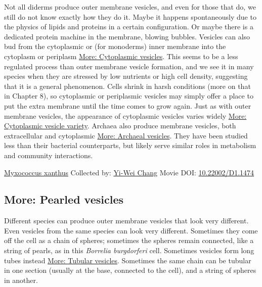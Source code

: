 \documentclass[]{tufte-book}
\begin{document}
Not all diderms produce outer membrane vesicles, and even for those that do, we still do not know exactly how they do it. Maybe it happens spontaneously due to the physics of lipids and proteins in a certain configuration. Or maybe there is a dedicated protein machine in the membrane, blowing bubbles. Vesicles can also bud from the cytoplasmic or (for monoderms) inner membrane into the cytoplasm or periplasm \protect\hyperlink{Cytoplasmic_vesicles}{More: Cytoplasmic vesicles}. This seems to be a less regulated process than outer membrane vesicle formation, and we see it in many species when they are stressed by low nutrients or high cell density, suggesting that it is a general phenomenon. Cells shrink in harsh conditions (more on that in Chapter 8), so cytoplasmic or periplasmic vesicles may simply offer a place to put the extra membrane until the time comes to grow again. Just as with outer membrane vesicles, the appearance of cytoplasmic vesicles varies widely \protect\hyperlink{Cytoplasmic_vesicle_variety}{More: Cytoplasmic vesicle variety}. Archaea also produce membrane vesicles, both extracellular and cytoplasmic \protect\hyperlink{Archaeal_vesicles}{More: Archaeal vesicles}. They have been studied less than their bacterial counterparts, but likely serve similar roles in metabolism and community interactions.



\hypertarget{htmlwidget-994785f686f1c335967d}{}

\label{fig:2-4}\protect\hyperlink{tree}{Myxococcus xanthus} Collected by: \protect\hyperlink{yi-wei_chang}{Yi-Wei Chang} Movie DOI: \href{https://doi.org/10.22002/D1.1474}{10.22002/D1.1474}

\hypertarget{Pearled_vesicles}{%
\subsection*{More: Pearled vesicles}\label{Pearled_vesicles}}

Different species can produce outer membrane vesicles that look very different. Even vesicles from the same species can look very different. Sometimes they come off the cell as a chain of spheres; sometimes the spheres remain connected, like a string of pearls, as in this \emph{Borrelia burgdorferi} cell. Sometimes vesicles form long tubes instead \protect\hyperlink{Tubular_vesicles}{More: Tubular vesicles}. Sometimes the same chain can be tubular in one section (usually at the base, connected to the cell), and a string of spheres in another.
\end{document}
